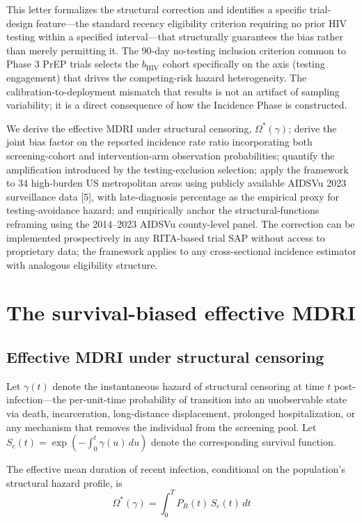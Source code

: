 \documentclass[12pt]{article}
\begin{document}
This letter formalizes the structural correction and identifies a specific trial-design feature---the standard recency eligibility criterion requiring no prior HIV testing within a specified interval---that structurally guarantees the bias rather than merely permitting it. The 90-day no-testing inclusion criterion common to Phase 3 PrEP trials selects the $b_{\mathrm{HIV}}$ cohort specifically on the axis (testing engagement) that drives the competing-risk hazard heterogeneity. The calibration-to-deployment mismatch that results is not an artifact of sampling variability; it is a direct consequence of how the Incidence Phase is constructed.

We derive the effective MDRI under structural censoring, $\Omega^*(\gamma)$; derive the joint bias factor on the reported incidence rate ratio incorporating both screening-cohort and intervention-arm observation probabilities; quantify the amplification introduced by the testing-exclusion selection; apply the framework to 34 high-burden US metropolitan areas using publicly available AIDSVu 2023 surveillance data [5], with late-diagnosis percentage as the empirical proxy for testing-avoidance hazard; and empirically anchor the structural-functions reframing using the 2014--2023 AIDSVu county-level panel. The correction can be implemented prospectively in any RITA-based trial SAP without access to proprietary data; the framework applies to any cross-sectional incidence estimator with analogous eligibility structure.

\section{The survival-biased effective MDRI}

\subsection{Effective MDRI under structural censoring}

Let $\gamma(t)$ denote the instantaneous hazard of structural censoring at time $t$ post-infection---the per-unit-time probability of transition into an unobservable state via death, incarceration, long-distance displacement, prolonged hospitalization, or any mechanism that removes the individual from the screening pool. Let $S_c(t) = \exp\left(-\int_0^t \gamma(u)\, du\right)$ denote the corresponding survival function.

The effective mean duration of recent infection, conditional on the population's structural hazard profile, is
\begin{equation}
\Omega^*(\gamma) = \int_0^T P_R(t)\, S_c(t)\, dt
\end{equation}
\end{document}
